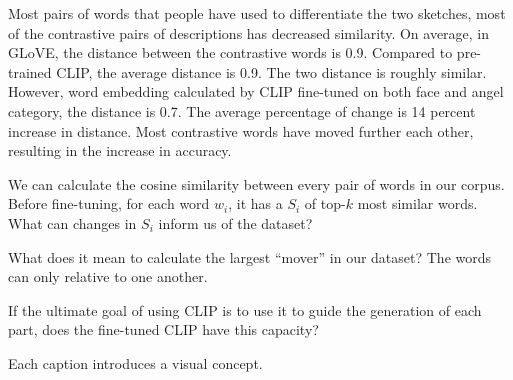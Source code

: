 Most pairs of words that people have used to differentiate the two sketches, most of the contrastive pairs of descriptions has decreased similarity.
On average, in GLoVE, the distance between the contrastive words is 0.9. 
Compared to pre-trained CLIP, the average distance is 0.9. The two distance is roughly similar. 
However, word embedding calculated by CLIP fine-tuned on both face and angel category, the distance is 0.7. The average percentage of change is 14 percent increase in distance. Most contrastive words have moved further each other, resulting in the increase in accuracy.

We can calculate the cosine similarity between every pair of words in our corpus. Before fine-tuning, for each word $w_i$, it has a $S_i$ of top-$k$ most similar words. What can changes in $S_i$ inform us of the dataset?  

What does it mean to calculate the largest ``mover'' in our dataset? The words can only relative to one another.  

If the ultimate goal of using CLIP is to use it to guide the generation of each part, does the fine-tuned CLIP have this capacity? 

Each caption introduces a visual concept. 
